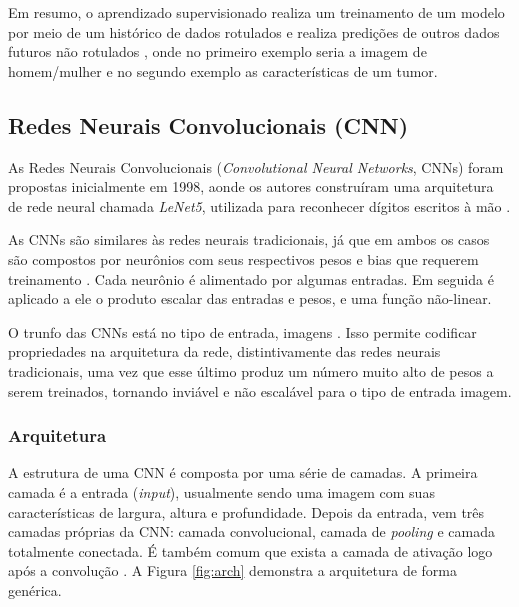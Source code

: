 Em resumo, o aprendizado supervisionado realiza um treinamento de um modelo por meio de um histórico de dados rotulados e realiza predições de outros dados futuros não rotulados \cite{santos2018identificaccao}, onde no primeiro exemplo seria a imagem de homem/mulher e no segundo exemplo as características de um tumor.

\subsection{Redes Neurais Convolucionais (CNN)}
As Redes Neurais Convolucionais (\textit{Convolutional Neural Networks}, CNNs) foram propostas inicialmente em 1998, aonde os autores construíram uma arquitetura de rede neural chamada \textit{LeNet5}, utilizada para reconhecer dígitos escritos à mão \cite{lecun1998gradient}.

As CNNs são similares às redes neurais tradicionais, já que em ambos os casos são compostos por neurônios com seus respectivos pesos e bias que requerem treinamento \cite{haykin2007redes}. Cada neurônio é alimentado por algumas entradas. Em seguida é aplicado a ele o produto escalar das entradas e pesos, e uma função não-linear. 

O trunfo das CNNs está no tipo de entrada, imagens \cite{santos2018identificaccao}. Isso permite codificar propriedades na arquitetura da rede, distintivamente das redes neurais tradicionais, uma vez que esse último produz um número muito alto de pesos a serem treinados, tornando inviável e não escalável para o tipo de entrada imagem.

\subsubsection{Arquitetura}

A estrutura de uma CNN é composta por uma série de camadas. A primeira camada é a entrada (\textit{input}), usualmente sendo uma imagem com suas características de largura, altura e profundidade. Depois da entrada, vem três camadas próprias da CNN: camada convolucional, camada de \textit{pooling} e camada totalmente conectada. É também comum que exista a camada de ativação logo após a convolução  \cite{haykin2007redes}. A Figura \ref{fig:arch} demonstra a arquitetura de forma genérica.

